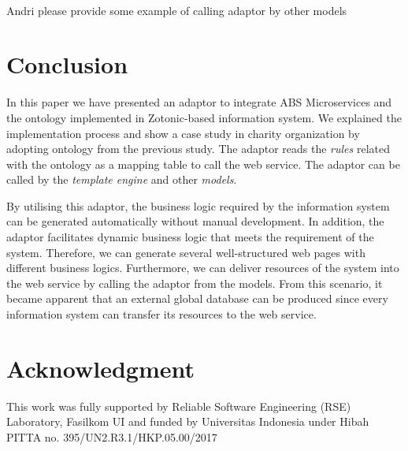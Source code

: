\documentclass[conference]{IEEEtran}
\begin{document}
\\Andri please provide some example of calling adaptor by other models

\section{Conclusion} \label{conclusion}
In this paper we have presented an adaptor to integrate ABS Microservices and the ontology implemented in Zotonic-based information system. We explained the implementation process and show a case study in charity organization by adopting ontology from the previous study. The adaptor reads the \textit{rules} related with the ontology as a mapping table to call the web service. The adaptor can be called by the \textit{template engine} and other \textit{models}.

By utilising this adaptor, the business logic required by the information system can be generated automatically without manual development. In addition, the adaptor facilitates dynamic business logic that meets the requirement of the system. Therefore, we can generate several well-structured web pages with different business logics. Furthermore, we can deliver resources of the system into the web service by calling the adaptor from the models. From this scenario, it became apparent that an external global database can be produced since every information system can transfer its resources to the web service. 

\section*{Acknowledgment}
This work was fully supported by Reliable Software Engineering (RSE) Laboratory, Fasilkom UI and funded by Universitas Indonesia under Hibah PITTA no. 395/UN2.R3.1/HKP.05.00/2017




\end{document}
